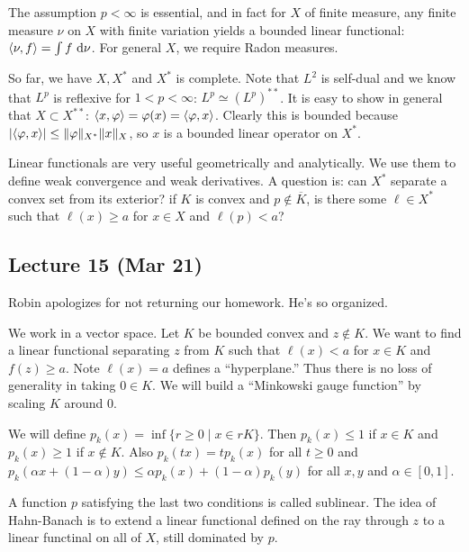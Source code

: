 \documentclass[10pt, twoside]{article}
\renewcommand{\d}{\ \mathrm{d}}
\begin{document}
    \begin{rmk} The assumption $p < \infty$ is essential, and in fact for $X$
        of finite measure, any finite measure $\nu$ on $X$ with finite
        variation yields a bounded linear functional: $\gen{\nu,f} = \int f \d
        \nu$. For general $X$, we require Radon measures.  \end{rmk}
    
    So far, we have $X, X^*$ and $X^*$ is complete. Note that $L^2$ is
    self-dual and we know that $L^p$ is reflexive for $1 < p < \infty$: $L^p
    \simeq (L^p)^{**}$. It is easy to show in general that $X \subset X^{**}$:
    $\langle x,\varphi\rangle = \varphi(x) = \langle\varphi, x\rangle$. Clearly this is bounded
    because $\lvert\langle\varphi,x\rangle\rvert \leq \lVert\varphi\rVert_{X^*} \lVert x\rVert_X$, so
    $x$ is a bounded linear operator on $X^*$.

    Linear functionals are very useful geometrically and analytically. We use
    them to define weak convergence and weak derivatives. A question is: can
    $X^*$ separate a convex set from its exterior? if $K$ is convex and $p
    \not\in \overline{K}$, is there some $\ell \in X^*$ such that $\ell(x) \geq
    a$ for $x \in X$ and $\ell(p) < a$?

    \subsection{Lecture 15 (Mar 21)}

    Robin apologizes for not returning our homework. He's so organized.
    
    We work in a vector space. Let $K$ be bounded convex and $z \notin K$. We
    want to find a linear functional separating $z$ from $K$ such that $\ell(x)
    < a$ for $x \in K$ and $f(z) \geq a$. Note $\ell(x) = a$ defines a
    ``hyperplane.'' Thus there is no loss of generality in taking $0 \in K$. We
    will build a ``Minkowski gauge function'' by scaling $K$ around $0$. 
    
    We will define $p_k(x) = \inf \{ r \geq 0 \mid x \in rK\}$. Then $p_k(x)
    \leq 1$ if $x \in K$ and $p_k(x) \geq 1$ if $x \notin K$. Also $p_k(tx) =
    tp_k(x)$ for all $t \geq 0$ and $p_k(\alpha x + (1-\alpha)y) \leq \alpha
    p_k(x) + (1-\alpha)p_k(y)$ for all $x,y$ and $\alpha \in [0,1]$.

    A function $p$ satisfying the last two conditions is called sublinear. The
    idea of Hahn-Banach is to extend a linear functional defined on the ray
    through $z$ to a linear functinal on all of $X$, still dominated by $p$.
\end{document}
